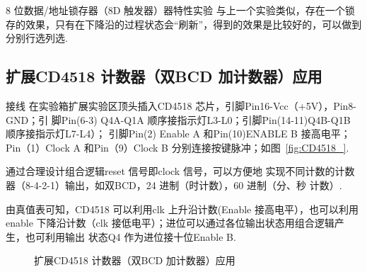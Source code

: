 \documentclass[11pt]{SEU-Digital-Report}
\begin{document}
    \begin{analyze}{8 位数据/地址锁存器（8D 触发器）器特性实验}{}
      与上一个实验类似，存在一个锁存的效果，只有在下降沿的过程状态会“刷新”，得到的效果是比较好的，可以做到分别行选列选.
    \end{analyze}


    \subsection{扩展CD4518 计数器（双BCD 加计数器）应用}

    \begin{note}{接线}{}
      在实验箱扩展实验区顶头插入CD4518 芯片，引脚Pin16-Vcc（+5V），Pin8-GND；引
脚Pin(6-3) Q4A-Q1A 顺序接指示灯L3-L0；引脚Pin(14-11)Q4B-Q1B 顺序接指示灯L7-L4）；
引脚Pin(2) Enable A 和Pin(10)ENABLE B 接高电平；Pin（1）Clock A 和Pin（9）Clock B
分别连接按键脉冲；如图~\ref{fig:CD4518_}. 
    \end{note}
    通过合理设计组合逻辑reset 信号即clock 信号，可以方便地
实现不同计数的计数器（8-4-2-1）输出，如双BCD，24 进制（时计数），60 进制（分、秒
计数）. 

    由真值表可知，CD4518 可以利用clk 上升沿计数(Enable 接高电平），也可以利用enable
下降沿计数（clk 接低电平）；进位可以通过各位输出状态用组合逻辑产生，也可利用输出
状态Q4 作为进位接十位Enable B. 

    \begin{figure}[htbp]
      \centering
      \quad
      \caption{扩展CD4518 计数器（双BCD 加计数器）应用}
    \end{figure}
\end{document}
